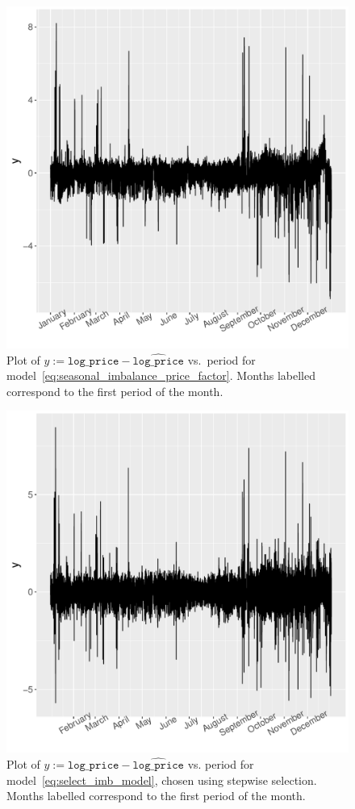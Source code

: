 \documentclass[11pt,twoside,openany]{book}
\newcommand{\code}[1]{\texttt{#1}}
\numberwithin{Theorem}{chapter}
\numberwithin{Definition}{chapter}
\numberwithin{Lemma}{chapter}
\numberwithin{Algorithm}{chapter}
\numberwithin{equation}{chapter}
\begin{document}
\begin{figure}[htp]
  \centering
  \includegraphics[scale=0.6]{../elexon/figures/y_resid.pdf}
  \caption{Plot of $y :=\code{log_price} - \widehat{\code{log_price}}$ vs.\ period
  for model~\eqref{eq:seasonal_imbalance_price_factor}. Months labelled
correspond to the first period of the month.}\label{fig:lprice_res_simple}
\end{figure}

\begin{figure}[htp]
  \centering
  \includegraphics[scale=0.60]{../elexon/figures/y_lm_final.pdf}
  \caption{Plot of $y :=\code{log_price} - \widehat{\code{log_price}}$ vs.
    period for model~\ref{eq:select_imb_model}, chosen using stepwise selection. Months labelled
correspond to the first period of the month.}\label{fig:lprice_res_stepwise}
\end{figure}
\FloatBarrier
\end{document}
